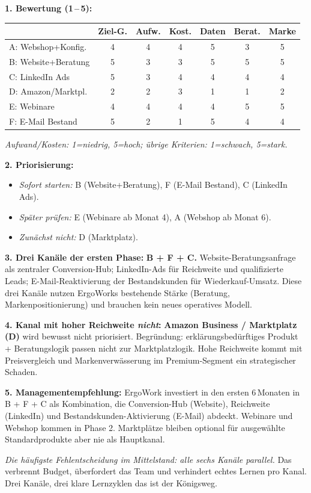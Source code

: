 \documentclass[11pt,a4paper,oneside]{article}
\begin{document}
\begin{loesungbox}
\textbf{1. Bewertung (1\,--\,5):}

\smallskip
\begin{tabularx}{\linewidth}{@{}lcccccc@{}}
\toprule
& \textbf{Ziel-G.} & \textbf{Aufw.} & \textbf{Kost.} & \textbf{Daten} & \textbf{Berat.} & \textbf{Marke} \\
\midrule
A: Webshop+Konfig.   & 4 & 4 & 4 & 5 & 3 & 5 \\
B: Website+Beratung & 5 & 3 & 3 & 5 & 5 & 5 \\
C: LinkedIn Ads      & 5 & 3 & 4 & 4 & 4 & 4 \\
D: Amazon/Marktpl.   & 2 & 2 & 3 & 1 & 1 & 2 \\
E: Webinare          & 4 & 4 & 4 & 4 & 5 & 5 \\
F: E-Mail Bestand    & 5 & 2 & 1 & 5 & 4 & 4 \\
\bottomrule
\end{tabularx}

\smallskip
\emph{Aufwand/Kosten: 1=niedrig, 5=hoch; übrige Kriterien: 1=schwach, 5=stark.}

\textbf{2. Priorisierung:}
\begin{itemize}
  \item \emph{Sofort starten:} B (Website+Beratung), F (E-Mail Bestand), C (LinkedIn Ads).
  \item \emph{Später prüfen:} E (Webinare \textendash{} ab Monat 4), A (Webshop \textendash{} ab Monat 6).
  \item \emph{Zunächst nicht:} D (Marktplatz).
\end{itemize}

\textbf{3. Drei Kanäle der ersten Phase:}
\textbf{B + F + C.} Website-Beratungsanfrage als zentraler Conversion-Hub; LinkedIn-Ads für Reichweite und qualifizierte Leads; E-Mail-Reaktivierung der Bestandskunden für Wiederkauf-Umsatz. Diese drei Kanäle nutzen ErgoWorks bestehende Stärke (Beratung, Markenpositionierung) und brauchen kein neues operatives Modell.

\textbf{4. Kanal mit hoher Reichweite \emph{nicht}:}
\textbf{Amazon Business / Marktplatz (D)} wird bewusst nicht priorisiert. Begründung: erklärungsbedürftiges Produkt + Beratungslogik passen nicht zur Marktplatzlogik. Hohe Reichweite kommt mit Preisvergleich und Markenverwässerung \textendash{} im Premium-Segment ein strategischer Schaden.

\textbf{5. Managementempfehlung:}
ErgoWork investiert in den ersten 6\,Monaten in B + F + C als Kombination, die Conversion-Hub (Website), Reichweite (LinkedIn) und Bestandskunden-Aktivierung (E-Mail) abdeckt. Webinare und Webshop kommen in Phase 2. Marktplätze bleiben optional für ausgewählte Standardprodukte \textendash{} aber nie als Hauptkanal.

\begin{merkbox}[Managementhinweis]
\emph{Die häufigste Fehlentscheidung im Mittelstand: alle sechs Kanäle parallel.} Das verbrennt Budget, überfordert das Team und verhindert echtes Lernen pro Kanal. Drei Kanäle, drei klare Lernzyklen \textendash{} das ist der Königsweg.
\end{merkbox}
\end{loesungbox}
\end{document}
